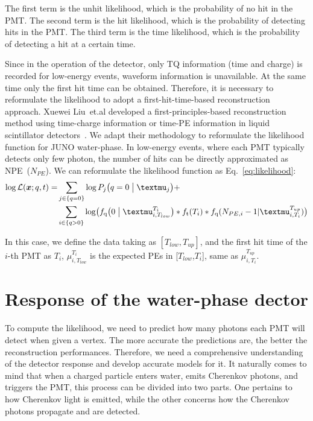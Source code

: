 The first term is the unhit likelihood, which is the probability of no hit in the PMT. The second term is the hit likelihood, which is the probability of detecting hits in the PMT. The third term is the time likelihood, which is the probability of detecting a hit at a certain time.

Since in the operation of the detector, only TQ information (time and charge) is recorded for low-energy events, waveform information is unavailable. At the same time only the first hit time can be obtained. Therefore, it is necessary to reformulate the likelihood to adopt a first-hit-time-based reconstruction approach. Xuewei Liu~et.al developed a first-principles-based reconstruction method using time-charge information or time-PE information in liquid scintillator detectors~\cite{Liu:2024cxo}. We adapt their methodology to reformulate the likelihood function for JUNO water-phase. In low-energy events, where each PMT typically detects only few photon, the number of hits can be directly approximated as NPE~($N_{PE}$). We can reformulate the likelihood function as Eq.~\eqref{eq:likelihood}:
\begin{equation}
	\begin{aligned}
		\log \mathcal{L}(\boldsymbol{x};{q},{t})= & \sum_{j \in \{q=0\}}\log P_j \bigl( q=0\bigm| \mu_j \bigr)+                                                                                                                  \\
		                                          & \sum_{i \in \{q>0\}} \log \bigl( f_{\mathrm{q}}\bigl( 0 \bigm| \mu_{i,T_{low}}^{T_i} \bigr) * f_{\mathrm{t}}(T_i) * f_{\mathrm{q}}(N_{PE,i}-1|\mu_{i,T_{i}}^{T_{up}}) \bigr)
	\end{aligned}
	\label{eq:likelihood}
\end{equation}

In this case, we define the data taking as $[T_{low},T_{up}]$, and the first hit time of the $i$-th PMT as $T_{i}$, $\mu_{i,T_{low}}^{T_i}$ is the expected PEs in [$T_{low}$,${T_i}$], same as $\mu_{i,T_{i}}^{T_{up}}$.

\section{Response of the water-phase dector}
To compute the likelihood, we need to predict how many photons each PMT will detect when given a vertex. The more accurate the predictions are, the better the reconstruction performances. Therefore, we need a comprehensive understanding of the detector response and develop accurate models for it.
It naturally comes to mind that when a charged particle enters water, emits Cherenkov photons, and triggers the PMT, this process can be divided into two parts. One pertains to how Cherenkov light is emitted, while the other concerns how the Cherenkov photons propagate and are detected.

